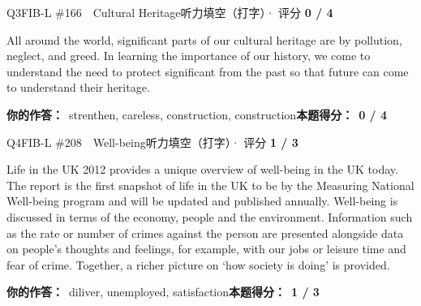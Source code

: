 \begin{qblock}{Q3\quad FIB-L \#166\ \ Cultural Heritage}{听力填空（打字）· 评分 \textcolor{cAccent}{\bfseries 0 / 4}}
\begin{promptbox}
All around the world, significant parts of our cultural heritage are  by pollution, neglect,  and greed. In learning the importance of our history, we come to understand the need to protect significant  from the past so that future  can come to understand their heritage.
\end{promptbox}
\par\smallskip
\textbf{你的作答：}\ {\color{cWrong}strenthen, careless, construction, construction}\qquad\textbf{本题得分：}\ {\color{cAccent}\bfseries 0 / 4}
\end{qblock}

\begin{qblock}{Q4\quad FIB-L \#208\ \ Well-being}{听力填空（打字）· 评分 \textcolor{cAccent}{\bfseries 1 / 3}}
\begin{promptbox}
Life in the UK 2012 provides a unique overview of well-being in the UK today. The report is the first snapshot of life in the UK to be  by the Measuring National Well-being program and will be updated and published annually. Well-being is discussed in terms of the economy, people and the environment. Information such as the  rate or number of crimes against the person are presented alongside data on people's thoughts and feelings, for example,  with our jobs or leisure time and fear of crime. Together, a richer picture on `how society is doing' is provided.
\end{promptbox}
\par\smallskip
\textbf{你的作答：}\ {\color{cWrong}diliver}, {\color{cWrong}unemployed}, satisfaction\qquad\textbf{本题得分：}\ {\color{cAccent}\bfseries 1 / 3}
\end{qblock}

